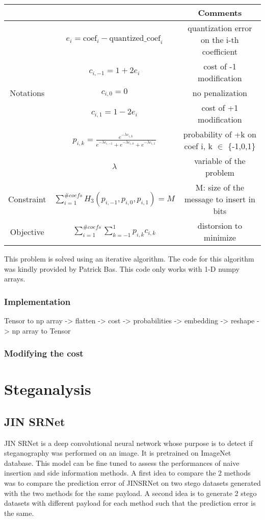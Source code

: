 \documentclass[12pt]{article}
\begin{document}
\begin{center}
\begin{tabular}{ |c|c|c| }
    \hline
    &  & Comments\\
    \hline
    & $e_i = \text{coef}_i - \text{quantized\_coef}_i$ & quantization error on the i-th coefficient\\ 
    & $c_{i,-1} = 1 + 2e_i$ & cost of -1 modification\\ 
    Notations & $c_{i,0} = 0$ & no penalization\\
    & $c_{i,1} = 1 - 2e_i$ & cost of +1 modification\\
    & $p_{i,k} = \frac{e^{-\lambda c_{i,k}}}{e^{-\lambda c_{i,-1}} + e^{-\lambda c_{i,0}} + e^{-\lambda c_{i,1}}}$ & probability of +k on coef i, k $\in$ \{-1,0,1\}\\
    & $\lambda$ & variable of the problem\\
    \hline
    Constraint & $\displaystyle\sum_{i=1}^{\# coefs}{H_3(p_{i,-1},p_{i,0},p_{i,1})} = M$ & M: size of the message to insert in bits\\
    \hline
    Objective & $\displaystyle\sum_{i=1}^{\# coefs}{\sum_{k=-1}^{1}{p_{i,k}c_{i,k}}}$ & distorsion to minimize \\ 
    \hline
\end{tabular}
\end{center}
This problem is solved using an iterative algorithm. The code for this algorithm was kindly provided by Patrick Bas. This code only works with 1-D numpy arrays.

\subsubsection{Implementation}
Tensor to np array -> flatten -> cost -> probabilities -> embedding -> reshape -> np array to Tensor 
\subsubsection{Modifying the cost}
\section{Steganalysis}
\subsection{JIN SRNet}
JIN SRNet is a deep convolutional neural network whose purpose is to detect if steganography was performed on an image. It is pretrained on ImageNet database. This model can be fine tuned to assess the performances of naive insertion and side information methods. A first idea to compare the 2 methods was to compare the prediction error of JINSRNet on two stego datasets generated with the two methods for the same payload. A second idea is to generate 2 stego datasets with different payload for each method such that the prediction error is the same. 
\end{document}
